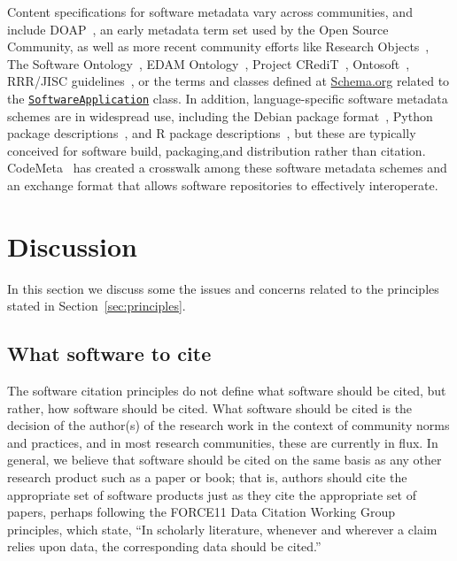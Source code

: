 \documentclass[11pt, oneside]{amsart}
\begin{document}
Content specifications for software metadata vary across communities, and
include DOAP~\cite{DOAP}, an early metadata
term set used by the Open Source Community, as well as more recent community
efforts like Research Objects~\cite{Bechhofer2013599}, The Software Ontology~\cite{Malone2014}, EDAM Ontology~\cite{Ison15052013}, Project
CRediT~\cite{casrai-credit}, Ontosoft~\cite{ontosoft}, RRR\slash JISC guidelines~\cite{JISC2015}, 
or the terms and classes defined at \href{https://schema.org}{Schema.org} related to the
\href{https://schema.org/SoftwareApplication}{\texttt{SoftwareApplication}} class.   In addition,
language-specific software metadata schemes are in widespread use, including the Debian
package format~\cite{Debian_policy}, Python package descriptions~\cite{pypi}, and R package descriptions~\cite{wickham_r_2015}, but these are typically
conceived for software build, packaging,and distribution rather than citation.  CodeMeta~\cite{codemeta}
has created a crosswalk among these software metadata schemes and an exchange format that
allows software repositories to effectively interoperate.


\section{Discussion}
\label{sec:discussion}

In this section we discuss some the issues and concerns related to the principles stated in Section~\ref{sec:principles}.

\subsection{What software to cite}

The software citation principles do not define what software should be cited, but rather, how software should be cited.
What software should be cited is the decision of the author(s) of the research work in the context of community norms and practices, and in most research communities, these are currently in flux.
In general, we believe that software should be cited on the same basis as any other research product such as a paper or book; that is, authors should cite the appropriate set of software products just as they cite the appropriate set of papers, perhaps following the
FORCE11 Data Citation Working Group principles, which state, ``In scholarly literature, whenever and wherever a claim relies upon data, the corresponding data should be cited.''~\cite{data-citation-principles}
\end{document}
